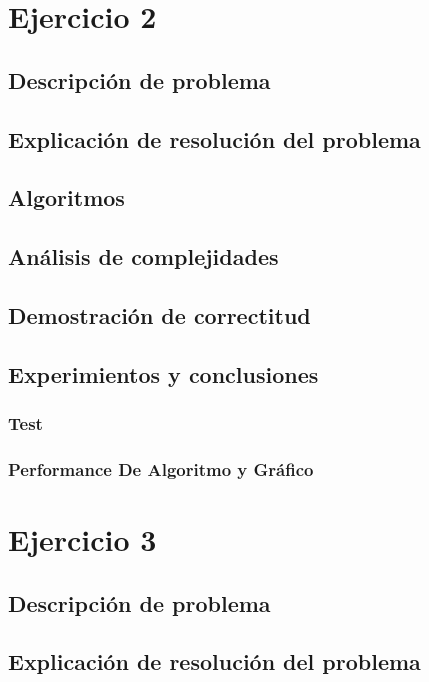 \documentclass[12pt, a4paper]{article}
\begin{document}
\newpage
\section{Ejercicio 2} 
\subsection{Descripci\'on de problema}

\subsection{Explicaci\'on de resoluci\'on del problema}

\subsection{Algoritmos}

\subsection{An\'alisis de complejidades}

\subsection{Demostraci\'on de correctitud}

\subsection{Experimientos y conclusiones}
\subsubsection[2.5]{Test}

\subsubsection[2.5]{Performance De Algoritmo y Gr\'afico}


\newpage
\section{Ejercicio 3} 
\subsection{Descripci\'on de problema}

\subsection{Explicaci\'on de resoluci\'on del problema}

\end{document}
